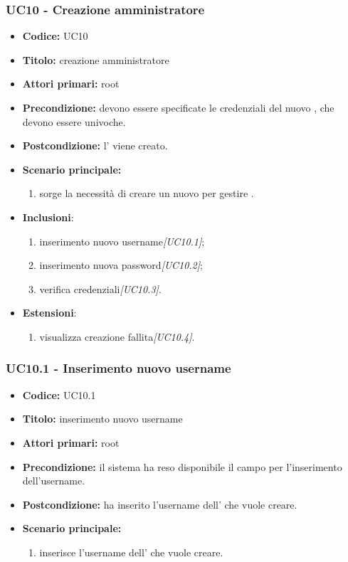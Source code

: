 \documentclass[casi-duso]{subfiles}
\begin{document}
\subsubsection{UC10 - Creazione amministratore}
\label{subsub:UC10}
\begin{itemize}
  \item \textbf{Codice:} UC10
  \item \textbf{Titolo:} creazione amministratore
  \item \textbf{Attori primari:} root
  \item \textbf{Precondizione:} devono essere specificate le credenziali del nuovo , che devono essere univoche.
  \item \textbf{Postcondizione:} l' viene creato.
  \item \textbf{Scenario principale:} 
  \begin{enumerate}
    \item sorge la necessità di creare un nuovo  per gestire .
  \end{enumerate}
  \item \textbf{Inclusioni}:
  \begin{enumerate}
    \item inserimento nuovo username\emph{[UC10.1]};
    \item inserimento nuova password\emph{[UC10.2]};
    \item verifica credenziali\emph{[UC10.3]}.
  \end{enumerate}
  \item \textbf{Estensioni}:
  \begin{enumerate}
    \item  visualizza creazione fallita\emph{[UC10.4]}.
  \end{enumerate}
\end{itemize}

\subsubsection{UC10.1 - Inserimento nuovo username}
\label{subsub:UC10.1}
\begin{itemize}
  \item \textbf{Codice:} UC10.1
  \item \textbf{Titolo:} inserimento nuovo username
  \item \textbf{Attori primari:} root
  \item \textbf{Precondizione:} il sistema ha reso disponibile il campo per l'inserimento dell'username.
  \item \textbf{Postcondizione:}  ha inserito l'username dell' che vuole creare.
  \item \textbf{Scenario principale:} 
  \begin{enumerate}
    \item {} inserisce l'username dell' che vuole creare.
  \end{enumerate}
\end{itemize}
\end{document}
